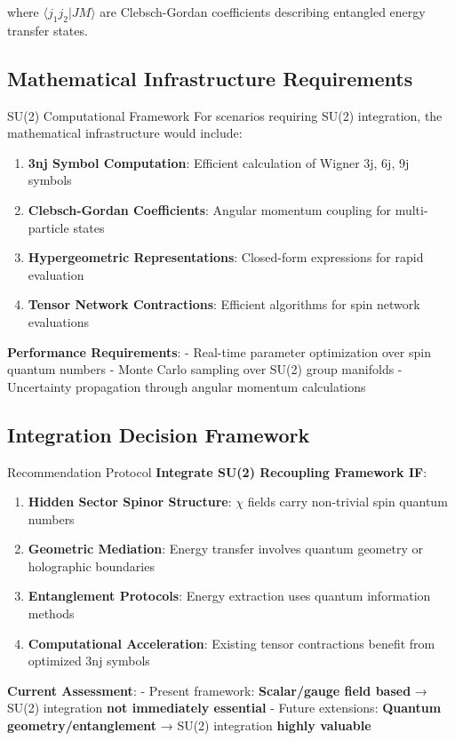 \documentclass[12pt]{article}
\begin{document}
where $\langle j_1 j_2 | J M \rangle$ are Clebsch-Gordan coefficients describing entangled energy transfer states.

\subsection{Mathematical Infrastructure Requirements}

\begin{physicsbox}{SU(2) Computational Framework}
For scenarios requiring SU(2) integration, the mathematical infrastructure would include:

\begin{enumerate}
\item \textbf{3nj Symbol Computation}: Efficient calculation of Wigner 3j, 6j, 9j symbols
\item \textbf{Clebsch-Gordan Coefficients}: Angular momentum coupling for multi-particle states
\item \textbf{Hypergeometric Representations}: Closed-form expressions for rapid evaluation
\item \textbf{Tensor Network Contractions}: Efficient algorithms for spin network evaluations
\end{enumerate}

\textbf{Performance Requirements}:
- Real-time parameter optimization over spin quantum numbers
- Monte Carlo sampling over SU(2) group manifolds
- Uncertainty propagation through angular momentum calculations
\end{physicsbox}

\subsection{Integration Decision Framework}

\begin{resultbox}{Recommendation Protocol}
\textbf{Integrate SU(2) Recoupling Framework IF}:

\begin{enumerate}
\item \textbf{Hidden Sector Spinor Structure}: $\chi$ fields carry non-trivial spin quantum numbers
\item \textbf{Geometric Mediation}: Energy transfer involves quantum geometry or holographic boundaries
\item \textbf{Entanglement Protocols}: Energy extraction uses quantum information methods
\item \textbf{Computational Acceleration}: Existing tensor contractions benefit from optimized 3nj symbols
\end{enumerate}

\textbf{Current Assessment}: 
- Present framework: \textbf{Scalar/gauge field based} → SU(2) integration \textbf{not immediately essential}
- Future extensions: \textbf{Quantum geometry/entanglement} → SU(2) integration \textbf{highly valuable}
\end{resultbox}
\end{document}
